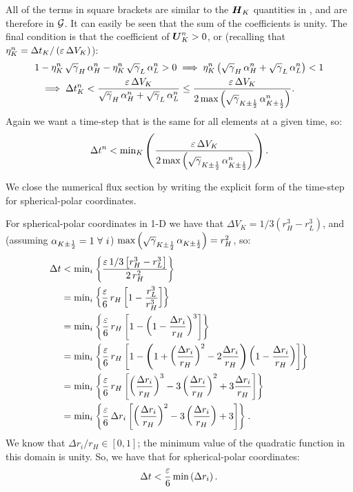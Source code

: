 All of the terms in square brackets are similar to the $\boldsymbol{H}_{K}$ quantities in \citet{Qin2016}, and are therefore in $\mathcal{G}$. It can easily be seen that the sum of the coefficients is unity. The final condition is that the coefficient of $\boldsymbol{U}^{n}_{K}>0$, or (recalling that $\eta^{n}_{K}=\Delta t_{K}/\left(\varepsilon\,\Delta V_{K}\right)$):
\begin{align}
    1&-\eta^{n}_{K}\,\sqrt{\gamma}_{H}\,\alpha^{n}_{H}-\eta^{n}_{K}\,\sqrt{\gamma}_{L}\,\alpha^{n}_{L}>0\implies\eta^{n}_{K}\left(\sqrt{\gamma}_{H}\,\alpha^{n}_{H}+\sqrt{\gamma}_{L}\,\alpha^{n}_{L}\right)<1\\
    &\implies\Delta t^{n}_{K}<\frac{\varepsilon\,\Delta V_{K}}{\sqrt{\gamma}_{H}\,\alpha^{n}_{H}+\sqrt{\gamma}_{L}\,\alpha^{n}_{L}}\leq\frac{\varepsilon\,\Delta V_{K}}{2\,\text{max}\left(\sqrt{\gamma}_{K\pm\frac{1}{2}}\,\alpha^{n}_{K\pm\frac{1}{2}}\right)}.
\end{align}
Again we want a time-step that is the same for all elements at a given time, so:
\begin{equation}
    \Delta t^{n}<\text{min}_{K}\left(\frac{\varepsilon\,\Delta V_{K}}{2\,\text{max}\left(\sqrt{\gamma}_{K\pm\frac{1}{2}}\,\alpha^{n}_{K\pm\frac{1}{2}}\right)}\right).
\end{equation}

We close the numerical flux section by writing the explicit form of the time-step for spherical-polar coordinates.

For spherical-polar coordinates in 1-D we have that $\Delta V_{K}=1/3\left(r_{H}^{3}-r_{L}^{3}\right)$, and (assuming $\alpha_{K\pm\f{1}{2}}=1\ \forall\ i$) $\text{max}\left(\sqrt{\gamma}_{K\pm\frac{1}{2}}\,\alpha_{K\pm\frac{1}{2}}\right)=r_{H}^{2}$, so:
\begin{align}
    \Delta t&<\text{min}_{i}\left\{\frac{\varepsilon\,1/3\left[r_{H}^{3}-r_{L}^{3}\right]}{2\,r_{H}^{2}}\right\}\\
    &=\text{min}_{i}\left\{\frac{\varepsilon}{6}\,r_{H}\left[1-\frac{r_{L}^{3}}{r_{H}^{3}}\right]\right\}\\
    &=\text{min}_{i}\left\{\frac{\varepsilon}{6}\,r_{H}\left[1-\left(1-\frac{\Delta r_{i}}{r_{H}}\right)^{3}\right]\right\}\\
    &=\text{min}_{i}\left\{\frac{\varepsilon}{6}\,r_{H}\left[1-\left(1+\left(\frac{\Delta r_{i}}{r_{H}}\right)^{2}-2\frac{\Delta r_{i}}{r_{H}}\right)\left(1-\frac{\Delta r_{i}}{r_{H}}\right)\right]\right\}\\
    &=\text{min}_{i}\left\{\frac{\varepsilon}{6}\,r_{H}\left[\left(\frac{\Delta r_{i}}{r_{H}}\right)^{3}-3\left(\frac{\Delta r_{i}}{r_{H}}\right)^{2}+3\frac{\Delta r_{i}}{r_{H}}\right]\right\}\\
    &=\text{min}_{i}\left\{\frac{\varepsilon}{6}\,\Delta r_{i}\left[\left(\frac{\Delta r_{i}}{r_{H}}\right)^{2}-3\left(\frac{\Delta r_{i}}{r_{H}}\right)+3\right]\right\}.
\end{align}
We know that $\Delta r_{i}/r_{H}\in\left[0,1\right]$; the minimum value of the quadratic function in this domain is unity. So, we have that for spherical-polar coordinates:
\begin{equation}
    \Delta t<\frac{\varepsilon}{6}\,\text{min}\left(\Delta r_{i}\right).
\end{equation}

